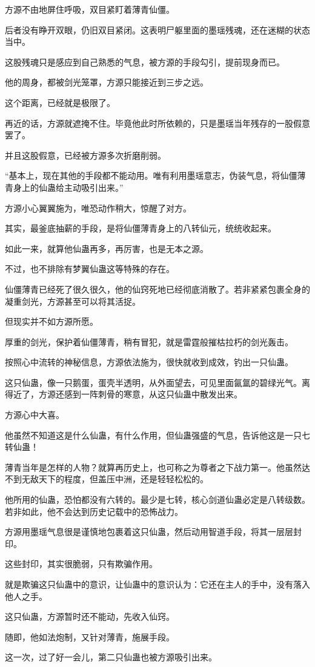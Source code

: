 \begin{this_body}
方源不由地屏住呼吸，双目紧盯着薄青仙僵。

后者没有睁开双眼，仍旧双目紧闭。这表明尸躯里面的墨瑶残魂，还在迷糊的状态当中。

这股残魂只是感应到自己熟悉的气息，被方源的手段勾引，提前现身而已。

他的周身，都被剑光笼罩，方源只能接近到三步之远。

这个距离，已经就是极限了。

再近的话，方源就遮掩不住。毕竟他此时所依赖的，只是墨瑶当年残存的一股假意罢了。

并且这股假意，已经被方源多次折磨削弱。

“基本上，现在其他的手段都不能动用。唯有利用墨瑶意志，伪装气息，将仙僵薄青身上的仙蛊给主动吸引出来。”

方源小心翼翼施为，唯恐动作稍大，惊醒了对方。

其实，最釜底抽薪的手段，是将仙僵薄青身上的八转仙元，统统收起来。

如此一来，就算他仙蛊再多，再厉害，也是无本之源。

不过，也不排除有梦翼仙蛊这等特殊的存在。

仙僵薄青已经死了很久很久，他的仙窍死地已经彻底消散了。若非紧紧包裹全身的凝重剑光，方源甚至可以将其活捉。

但现实并不如方源所愿。

厚重的剑光，保护着仙僵薄青，稍有冒犯，就是雷霆般摧枯拉朽的剑光轰击。

按照心中流转的神秘信息，方源依法施为，很快就收到成效，钓出一只仙蛊。

这只仙蛊，像一只鹅蛋，蛋壳半透明，从外面望去，可见里面氤氲的碧绿光气。离得近了，方源还感到一阵刺骨的寒意，从这只仙蛊中散发出来。

方源心中大喜。

他虽然不知道这是什么仙蛊，有什么作用，但仙蛊强盛的气息，告诉他这是一只七转仙蛊！

薄青当年是怎样的人物？就算再历史上，也可称之为尊者之下战力第一。他虽然达不到无敌天下的程度，但盖压中洲，还是轻轻松松的。

他所用的仙蛊，恐怕都没有六转的。最少是七转，核心剑道仙蛊必定是八转级数。若非如此，他不会达到历史记载中的恐怖战力。

方源用墨瑶气息很是谨慎地包裹着这只仙蛊，然后动用智道手段，将其一层层封印。

这些封印，其实很脆弱，只有欺骗作用。

就是欺骗这只仙蛊中的意识，让仙蛊中的意识认为：它还在主人的手中，没有落入他人之手。

这只仙蛊，方源暂时还不能动，先收入仙窍。

随即，他如法炮制，又针对薄青，施展手段。

这一次，过了好一会儿，第二只仙蛊也被方源吸引出来。

\end{this_body}

